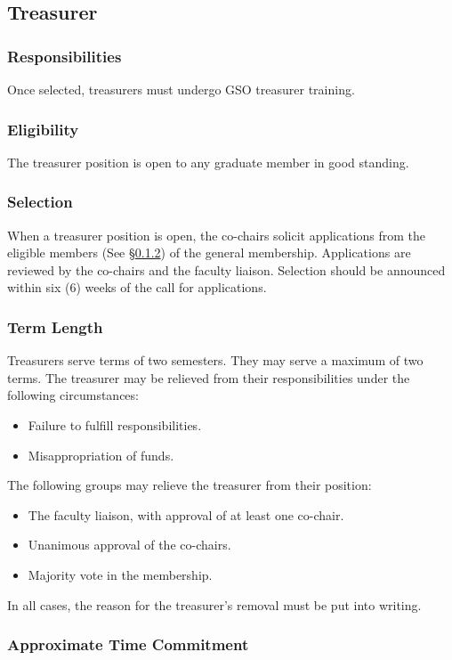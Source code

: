 \subsection{Treasurer}
\label{sec:treasurer}

\subsubsection{Responsibilities}
\label{sec:treasurer_responsibilities}
Once selected, treasurers must undergo GSO treasurer training.

\subsubsection{Eligibility}
\label{sec:treasurer_eligibility}
The treasurer position is open to any graduate member in good standing.

\subsubsection{Selection}
\label{sec:treasurer_selection}
When a treasurer position is open, the co-chairs solicit applications from the eligible members (See \S\ref{sec:treasurer_eligibility}) of the general membership. Applications are reviewed by the co-chairs and the faculty liaison. Selection should be announced within six (6) weeks of the call for applications. 

\subsubsection{Term Length}
\label{sec:treasurer_responsibilities}
Treasurers serve terms of two semesters. They may serve a maximum of two terms. The treasurer may be relieved from their responsibilities under the following circumstances:
\begin{itemize}
	\item Failure to fulfill responsibilities.
	\item Misappropriation of funds.
\end{itemize}
The following groups may relieve the treasurer from their position:
\begin{itemize}
	\item The faculty liaison, with approval of at least one co-chair.
	\item Unanimous approval of the co-chairs.
	\item Majority vote in the membership.
\end{itemize}
In all cases, the reason for the treasurer's removal must be put into writing.

\subsubsection{Approximate Time Commitment}
